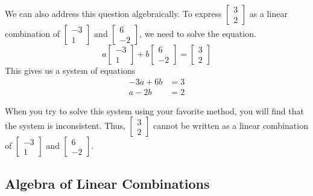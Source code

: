 \documentclass{ximera}
\begin{document}
\begin{example}
\begin{explanation}
We can also address this question algebraically.  To express $\begin{bmatrix}3\\2\end{bmatrix}$ as a linear combination of $\begin{bmatrix}-3\\1\end{bmatrix}$ and $\begin{bmatrix}6\\-2\end{bmatrix}$, we need to solve the equation.
$$a\begin{bmatrix}-3\\1\end{bmatrix}+b\begin{bmatrix}6\\-2\end{bmatrix}=\begin{bmatrix}3\\2\end{bmatrix}$$
This gives us a system of equations
\begin{align*}
-3a+6b&=3\\
a-2b&=2
\end{align*}

When you try to solve this system using your favorite method, you will find that the system is inconsistent.  Thus, $\begin{bmatrix}3\\2\end{bmatrix}$ cannot be written as a linear combination of $\begin{bmatrix}-3\\1\end{bmatrix}$ and $\begin{bmatrix}6\\-2\end{bmatrix}$.

\end{explanation}
\end{example}

\subsection*{Algebra of Linear Combinations}
\end{document}
